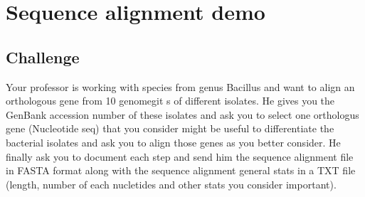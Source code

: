 \documentclass[
  letterpaper,
]{scrbook}
\newenvironment{Shaded}{\begin{snugshade}}{\end{snugshade}}
\newcommand{\AttributeTok}[1]{\textcolor[rgb]{0.40,0.46,0.14}{#1}}
\newcommand{\ControlFlowTok}[1]{\textcolor[rgb]{0.00,0.46,0.62}{#1}}
\newcommand{\FunctionTok}[1]{\textcolor[rgb]{0.28,0.35,0.67}{#1}}
\newcommand{\NormalTok}[1]{\textcolor[rgb]{0.00,0.46,0.62}{#1}}
\newcommand{\OtherTok}[1]{\textcolor[rgb]{0.00,0.46,0.62}{#1}}
\newcommand{\SpecialCharTok}[1]{\textcolor[rgb]{0.37,0.37,0.37}{#1}}
\newcommand{\StringTok}[1]{\textcolor[rgb]{0.13,0.47,0.30}{#1}}
\begin{document}
\begin{Shaded}
\end{Shaded}

\hypertarget{sequence-alignment-demo}{%
\chapter{Sequence alignment demo}\label{sequence-alignment-demo}}

\hypertarget{challenge-2}{%
\section*{Challenge}\label{challenge-2}}

Your professor is working with species from genus Bacillus and want to
align an orthologous gene from 10 genomegit s of different isolates. He
gives you the GenBank accession number of these isolates and ask you to
select one orthologus gene (Nucleotide seq) that you consider might be
useful to differentiate the bacterial isolates and ask you to align
those genes as you better consider. He finally ask you to document each
step and send him the sequence alignment file in FASTA format along with
the sequence alignment general stats in a TXT file (length, number of
each nucletides and other stats you consider important).
\end{document}
